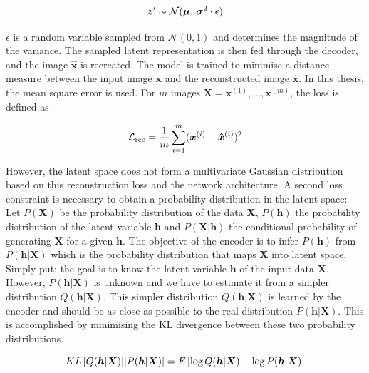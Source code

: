 \begin{equation}\eqlbl{hso_1}
	\boldsymbol{z}' \sim \mathcal{N}(\boldsymbol{\mu},\,\boldsymbol{\sigma}^{2} \cdot \epsilon)
\end{equation}

$\epsilon$ is a random variable sampled from  $\mathcal{N}(0, 1)$ and determines the magnitude of the variance. The sampled latent representation is then fed through the decoder, and the image $\hat{\boldsymbol{x}}$ is recreated. The model is trained to minimise a distance measure between the input image $\boldsymbol{x}$ and the reconstructed image $\hat{\boldsymbol{x}}$. In this thesis, the mean square error is used. For $m$ images $\boldsymbol{X} = \boldsymbol{x}^{(1)}, ..., \boldsymbol{x}^{(m)}$, the loss is defined as

\begin{equation}\eqlbl{hso_2}
	\mathcal{L}_{\text{rec}} = \frac{1}{m} \sum_{i=1}^{m} (\boldsymbol{x}^{(i)} - \boldsymbol{\hat{x}}^{(i)})^2
\end{equation}

However, the latent space does not form a multivariate Gaussian distribution based on this reconstruction loss and the network architecture. A second loss constraint is necessary to obtain a probability distribution in the latent space: Let $P(\boldsymbol{X})$ be the probability distribution of the data $\boldsymbol{X}$, $P(\boldsymbol{h})$ the probability distribution of the latent variable $\boldsymbol{h}$ and $P(\boldsymbol{X}|\boldsymbol{h})$ the conditional probability of generating $\boldsymbol{X}$ for a given $\boldsymbol{h}$. The objective of the encoder is to infer $P(\boldsymbol{h})$ from $P(\boldsymbol{h}|\boldsymbol{X})$ which is the probability distribution that maps $\boldsymbol{X}$ into latent space. Simply put: the goal is to know the latent variable $\boldsymbol{h}$ of the input data $\boldsymbol{X}$.
However, $P(\boldsymbol{h}|\boldsymbol{X})$ is unknown and we have to estimate it from a simpler distribution $Q(\boldsymbol{h}|\boldsymbol{X})$. This simpler distribution $Q(\boldsymbol{h}|\boldsymbol{X})$ is learned by the encoder and should be as close as possible to the real distribution $P(\boldsymbol{h}|\boldsymbol{X})$. This is accomplished by minimising the KL divergence between these two probability distributions.

\begin{equation}\eqlbl{hso_3}
	KL \left[ Q(\boldsymbol{h}|\boldsymbol{X}) || P(\boldsymbol{h}|\boldsymbol{X}) \right] = E \left[ \log Q(\boldsymbol{h}|\boldsymbol{X}) - \log P(\boldsymbol{h}|\boldsymbol{X}) \right]
\end{equation}

